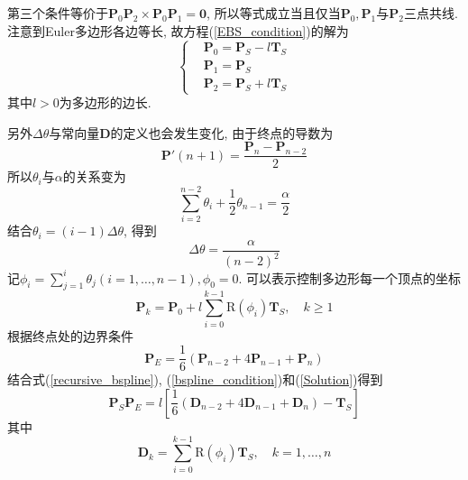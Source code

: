 \documentclass[utf8]{ctexart} %
\begin{document}
	 第三个条件等价于$\boldsymbol{P}_0\boldsymbol{P}_2\times\boldsymbol{P}_0\boldsymbol{P}_1=\boldsymbol{0}$, 所以等式成立当且仅当$\boldsymbol{P}_0,\boldsymbol{P}_1$与$\boldsymbol{P}_2$三点共线. 注意到Euler多边形各边等长,  故方程(\ref{EBS_condition})的解为
	 \begin{equation}\label{Solution}
	 \left\{
	 \begin{aligned}
	 &\boldsymbol{P}_0 = \boldsymbol{P}_S-l\boldsymbol{T}_S\\
	 &\boldsymbol{P}_1 = \boldsymbol{P}_S\\
	 &\boldsymbol{P}_2 = \boldsymbol{P}_S+l\boldsymbol{T}_S
	 \end{aligned}
	 \right.
	 \end{equation}
	 其中$l>0$为多边形的边长.\par 
	 另外$\Delta\theta$与常向量$\boldsymbol{D}$的定义也会发生变化, 由于终点的导数为
	 \begin{equation}
	 \boldsymbol{P}'(n+1) = \frac{\boldsymbol{P}_n-\boldsymbol{P}_{n-2}}2
	 \end{equation}
	 所以$\theta_i$与$\alpha$的关系变为
	 \begin{equation}
	 \sum_{i=2}^{n-2}\theta_i+\frac12\theta_{n-1}=\frac{\alpha}2
	 \end{equation}
	 结合$\theta_i=(i-1)\Delta\theta$, 得到
	 \begin{equation}
	 \Delta\theta = \frac{\alpha}{(n-2)^2}
	 \end{equation}
	 记$\phi_i=\sum_{j=1}^i\theta_j (i = 1,\dots,n-1), \phi_0 = 0$. 可以表示控制多边形每一个顶点的坐标
	 \begin{equation}\label{recursive_bspline}
	 \boldsymbol{P}_k = \boldsymbol{P}_0+l\sum_{i=0}^{k-1}\text{R}(\phi_i)\boldsymbol{T}_S,\quad k\geq1
	 \end{equation}
	 根据终点处的边界条件
	 \begin{equation}\label{bspline_condition}
	 \boldsymbol{P}_E = \frac{1}6(\boldsymbol{P}_{n-2}+4\boldsymbol{P}_{n-1}+\boldsymbol{P}_n)
	 \end{equation}
	结合式(\ref{recursive_bspline}), (\ref{bspline_condition})和(\ref{Solution})得到
	\begin{equation}
	\boldsymbol{P}_S\boldsymbol{P}_E=l[\frac16(\boldsymbol{D}_{n-2}+4\boldsymbol{D}_{n-1}+\boldsymbol{D}_n)-\boldsymbol{T}_S]
	\end{equation}
	其中\begin{equation}
	\boldsymbol{D}_k = \sum_{i=0}^{k-1}\text{R}(\phi_i)\boldsymbol{T}_S,\quad k=1,\dots,n
	\end{equation}
\end{document}
